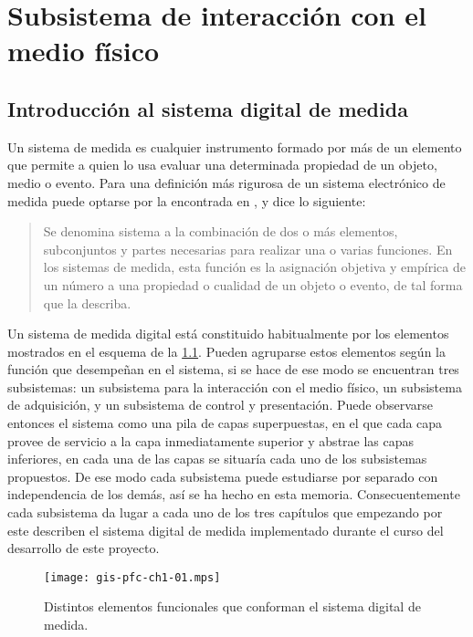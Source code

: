 \chapter{Subsistema de interacción con el medio físico}

\section{Introducción al sistema digital de medida}

Un sistema de medida es cualquier instrumento formado por más de un
elemento que permite a quien lo usa evaluar una determinada propiedad de un
objeto, medio o evento. Para una definición más rigurosa de un sistema
electrónico de medida puede optarse por la encontrada en
\cite{pallas2004sas}, y dice lo siguiente:

{\small\begin{quotation}
	Se denomina sistema a la combinación de dos o más elementos,
	subconjuntos y partes necesarias para realizar una o varias
	funciones. En los sistemas de medida, esta función es la asignación
	objetiva y empírica de un número a una propiedad o cualidad de un
	objeto o evento, de tal forma que la describa.
\end{quotation}}

Un sistema de medida digital está constituido habitualmente por los
elementos mostrados en el esquema de la \cref{fig:digmeasstm}. Pueden
agruparse estos elementos según la función que desempeñan en el sistema, si
se hace de ese modo se encuentran tres subsistemas: un subsistema para la
interacción con el medio físico, un subsistema de adquisición, y un
subsistema de control y presentación. Puede observarse entonces el sistema
como una pila de capas superpuestas, en el que cada capa provee de servicio
a la capa inmediatamente superior y abstrae las capas inferiores, en cada
una de las capas se situaría cada uno de los subsistemas propuestos. De ese
modo cada subsistema puede estudiarse por separado con independencia de los
demás, así se ha hecho en esta memoria. Consecuentemente cada subsistema da
lugar a cada uno de los tres capítulos que empezando por este describen el
sistema digital de medida implementado durante el curso del desarrollo de
este proyecto.

\begin{figure}
	\begin{center}
		\texttt{[image: gis-pfc-ch1-01.mps]}
	\end{center}
	\caption[Sistema digital de medida] {Distintos elementos
	funcionales que conforman el sistema digital de medida.}
	\label{fig:digmeasstm}
\end{figure}

